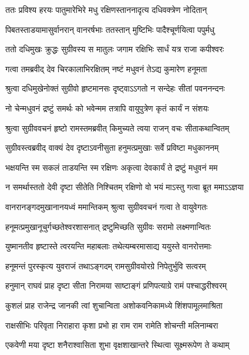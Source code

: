 \twolineshloka
{ततः प्रविश्य हरयः पातुमारेभिरे मधु}
{रक्षिणस्ताननादृत्य दधिवक्त्रेण नोदितान्} %

\twolineshloka
{पिबतस्ताडयामासुर्वानरान् वानरर्षभाः}
{ततस्तान् मुष्टिभिः पादैश्चूर्णयित्वा पपुर्मधु} %

\twolineshloka
{ततो दधिमुखः क्रुद्धः सुग्रीवस्य स मातुलः}
{जगाम रक्षिभिः सार्धं यत्र राजा कपीश्वरः} %

\twolineshloka
{गत्वा तमब्रवीद् देव चिरकालाभिरक्षितम्}
{नष्टं मधुवनं तेऽद्य कुमारेण हनूमता} %

\twolineshloka
{श्रुत्वा दधिमुखेनोक्तं सुग्रीवो हृष्टमानसः}
{दृष्ट्वाऽऽगतो न सन्देहः सीतां पवननन्दनः} %

\twolineshloka
{नो चेन्मधुवनं द्रष्टुं समर्थः को भवेन्मम}
{तत्रापि वायुपुत्रेण कृतं कार्यं न संशयः} %

\twolineshloka
{श्रुत्वा सुग्रीववचनं हृष्टो रामस्तमब्रवीत्}
{किमुच्यते त्वया राजन् वचः सीताकथान्वितम्} %

\twolineshloka
{सुग्रीवस्त्वब्रवीद् वाक्यं देव दृष्टाऽवनीसुता}
{हनुमत्प्रमुखाः सर्वे प्रविष्टा मधुकाननम्} %

\twolineshloka
{भक्षयन्ति स्म सकलं ताडयन्ति स्म रक्षिणः}
{अकृत्वा देवकार्यं ते द्रष्टुं मधुवनं मम} %

\twolineshloka
{न समर्थास्ततो देवी दृष्टा सीतेति निश्चितम्}
{रक्षिणो वो भयं माऽस्तु गत्वा ब्रूत ममाऽऽज्ञया} %

\twolineshloka
{वानरानङ्गदमुखानानयध्वं ममान्तिकम्}
{श्रुत्वा सुग्रीववचनं गत्वा ते वायुवेगतः} %

\twolineshloka
{हनूमत्प्रमुखानूचुर्गच्छतेश्वरशासनात्}
{द्रष्टुमिच्छति सुग्रीवः सरामो लक्ष्मणान्वितः} %

\twolineshloka
{युष्मानतीव हृष्टास्ते त्वरयन्ति महाबलाः}
{तथेत्यम्बरमासाद्य ययुस्ते वानरोत्तमाः} %

\twolineshloka
{हनूमन्तं पुरस्कृत्य युवराजं तथाऽङ्गदम्}
{रामसुग्रीवयोरग्रे निपेतुर्भुवि सत्वरम्} %

\twolineshloka
{हनुमान् राघवं प्राह दृष्टा सीता निरामया}
{साष्टाङ्गं प्रणिपत्याग्रे रामं पश्चाद्धरीश्वरम्} %

\twolineshloka
{कुशलं प्राह राजेन्द्र जानकी त्वां शुचान्विता}
{अशोकवनिकामध्ये शिंशपामूलमाश्रिता} %

\twolineshloka
{राक्षसीभिः परिवृता निराहारा कृशा प्रभो}
{हा राम राम रामेति शोचन्ती मलिनाम्बरा} %

\twolineshloka
{एकवेणी मया दृष्टा शनैराश्वासिता शुभा}
{वृक्षशाखान्तरे स्थित्वा सूक्ष्मरूपेण ते कथाम्} %

